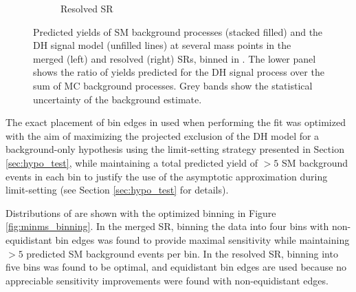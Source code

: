 \begin{figure}[htbp]
\begin{subfigure}[t]{0.48\textwidth}
     \caption{Resolved SR}
    \end{subfigure}
    \caption{Predicted yields of SM background processes (stacked filled) and the DH signal model (unfilled lines) at several mass points in the merged (left) and resolved (right) SRs, binned in \minms. The lower panel shows the ratio of yields predicted for the DH signal process over the sum of MC background processes. Grey bands show the statistical uncertainty of the background estimate.}
   \label{fig:minms_shape_discrimination}
\end{figure}


The exact placement of bin edges in \minms used when performing the fit was optimized with the aim of maximizing the projected exclusion of the DH model for a background-only hypothesis using the limit-setting strategy presented in Section \ref{sec:hypo_test}, while maintaining a total predicted yield of \(>5\) SM background events in each bin to justify the use of the asymptotic approximation during limit-setting (see Section \ref{sec:hypo_test} for details). 

Distributions of \minms are shown with the optimized binning in Figure \ref{fig:minms_binning}. In the merged SR, binning the data into four \minms bins with non-equidistant bin edges was found to provide maximal sensitivity while maintaining \(>5\) predicted SM background events per bin. In the resolved SR, binning into five \minms bins was found to be optimal, and equidistant bin edges are used because no appreciable sensitivity improvements were found with non-equidistant edges.

